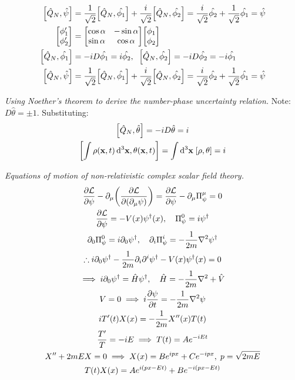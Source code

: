 \documentclass{report}
\begin{document}
\begin{subquests}
\begin{subquests}
		\item
		\begin{align*}
			\bqty{\hat{Q}_N, \hat{\psi}} & = \frac{1}{\sqrt{2}}\bqty{\hat{Q}_N, \hat{\phi_1}} + \frac{i}{\sqrt{2}}\bqty{\hat{Q}_N, \hat{\phi_2}} = \frac{i}{\sqrt{2}}\hat{\phi_2} + \frac{1}{\sqrt{2}}\hat{\phi_1} = \hat{\psi} \\
			\mqty[
				\phi_1' \\
				\phi_2' 
			]
			& = \mqty[
				\cos\alpha & -\sin\alpha \\
				\sin\alpha & \cos\alpha \\
			]\mqty[
				\phi_1 \\
				\phi_2
			] \\
			\bqty{\hat{Q}_N, \hat{\phi_1}} & = -iD\hat{\phi_1} = i\hat{\phi_2},\;\;\bqty{\hat{Q}_N, \hat{\phi_2}} = -iD\hat{\phi_2} = -i\hat{\phi_1} \\
			\bqty{\hat{Q}_N, \hat{\psi}} & = \frac{1}{\sqrt{2}}\bqty{\hat{Q}_N, \hat{\phi_1}} + \frac{i}{\sqrt{2}}\bqty{\hat{Q}_N, \hat{\phi_2}} = \frac{i}{\sqrt{2}}\hat{\phi_2} + \frac{1}{\sqrt{2}}\hat{\phi_1} = \hat{\psi}
		\end{align*}
	\end{subquests}
	

	\item \emph{Using Noether's theorem to derive the number-phase uncertainty relation.}
	Note: $D\hat{\theta} = \pm 1$. Substituting:
	\begin{gather*}
		\bqty{\hat{Q}_N, \hat{\theta}} = -iD\hat{\theta} = i \\
		\bqty{\int\rho({\vb x},t)\,\dd^3{\mathbf x}, \theta({\vb x},t)} = \int\dd^3{\vb x}\;\bqty{\rho,\theta} = i
	\end{gather*}

	\item \emph{Equations of motion of non-relativistic complex scalar field theory.}
	\begin{gather*}
		\pdv{\mathcal L}{\psi} - \partial_{\mu}\pqty{\pdv{\mathcal L}{\pqty{\partial_{\mu}\psi}}} = \pdv{\mathcal L}{\psi} - \partial_{\mu}\Pi^{\mu}_{\psi} = 0 \\
		\pdv{\mathcal L}{\psi} = -V(x)\psi^{\dagger}(x), \quad \Pi^0_{\psi} = i\psi^{\dagger} \\
		\partial_0\Pi^0_{\psi} = i\partial_0 \psi^{\dagger}, \quad \partial_i \Pi^i_{\psi} = -\frac{1}{2m}\nabla^2\psi^{\dagger}\\
		\therefore i\partial_0 \psi^{\dagger} -\frac{1}{2m}\partial_i\partial^i\psi^{\dagger} - V(x)\psi^{\dagger}(x) = 0 \\
		\implies i\partial_0\psi^{\dagger} = \hat{H}\psi^{\dagger}, \quad \hat{H} = -\frac{1}{2m}\nabla^2 + \hat{V} \\
		V = 0 \implies i\pdv{\psi}{t} = -\frac{1}{2m}\nabla^2\psi \\
		iT'(t)X(x) = -\frac{1}{2m}X''(x)T(t) \\
		\frac{T'}{T} = -iE \implies T(t) = Ae^{-iEt} \\
		X'' + 2mEX = 0 \implies X(x) = Be^{ipx} + Ce^{-ipx},\; p = \sqrt{2mE} \\
		T(t)X(x) = Ae^{i(px-Et)} + Be^{-i(px - Et)}
	\end{gather*}


\end{subquests}
\end{document}

